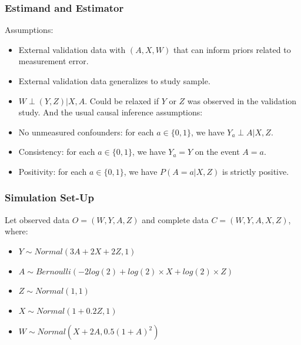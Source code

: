 \documentclass{beamer}
\begin{document}
\begin{frame}

\frametitle{ Estimand and Estimator}

Assumptions: 
\begin{itemize}
\item External validation data with $(A,X,W)$ that can inform priors related to measurement error.
\item External validation data generalizes to study sample.
\item $W \perp (Y, Z) \vert X, A$. Could be relaxed if $Y$ or $Z$ was observed in the validation study. 
And the usual causal inference assumptions:
\item No unmeasured confounders: for each $a \in \{ 0,1 \}$, we have $Y_a \perp A \vert X,Z$.
\item Consistency: for each $a \in \{ 0,1 \}$, we have $Y_a =Y$ on the event $A=a$.
\item Positivity: for each $a \in \{ 0,1 \}$, we have $P(A=a \vert X, Z)$ is strictly positive.
\end{itemize}

 

\end{frame} 

\begin{frame}

\frametitle{ Simulation Set-Up}


Let observed data $O=(W, Y, A, Z)$ and complete data $C=(W, Y, A, X, Z)$, where:

\begin{itemize}

\item $Y \sim Normal(3 A + 2X + 2 Z, 1)$

\item $A \sim Bernoulli(-2log(2) + log(2) \times X + log(2) \times Z)$ 

\item $Z \sim Normal(1, 1)$

\item $X \sim Normal(1 + 0.2 Z, 1)$

\item $W \sim Normal(X + 2A, 0.5(1 + A)^2)$

\end{itemize}

\end{frame} 
\end{document}
